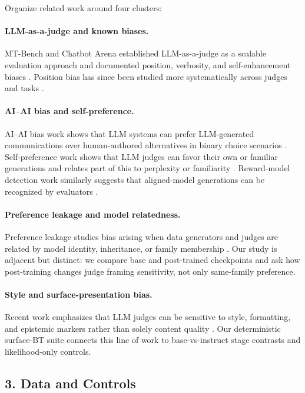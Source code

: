 \documentclass[11pt]{article}
\begin{document}
Organize related work around four clusters:

\paragraph{LLM-as-a-judge and known biases.}
MT-Bench and Chatbot Arena established LLM-as-a-judge as a scalable evaluation
approach and documented position, verbosity, and self-enhancement biases
\citep{zheng2023mtbench}. Position bias has since been studied more
systematically across judges and tasks \citep{shi2024positionbias}.

\paragraph{AI--AI bias and self-preference.}
AI--AI bias work shows that LLM systems can prefer LLM-generated
communications over human-authored alternatives in binary choice scenarios
\citep{laurito2025aiaibias}. Self-preference work shows that LLM judges can
favor their own or familiar generations and relates part of this to perplexity
or familiarity \citep{panickssery2024selfrecognition,
wataoka2024selfpreference}. Reward-model detection work similarly suggests
that aligned-model generations can be recognized by evaluators
\citep{lee2024remodetect}.

\paragraph{Preference leakage and model relatedness.}
Preference leakage studies bias arising when data generators and judges are
related by model identity, inheritance, or family membership
\citep{li2025preferenceleakage}. Our study is adjacent but distinct: we compare
base and post-trained checkpoints and ask how post-training changes judge
framing sensitivity, not only same-family preference.

\paragraph{Style and surface-presentation bias.}
Recent work emphasizes that LLM judges can be sensitive to style, formatting,
and epistemic markers rather than solely content quality
\citep{lee2024ember,soumik2026judging}. Our deterministic surface-BT suite
connects this line of work to base-vs-instruct stage contrasts and
likelihood-only controls.

\subsection{3. Data and Controls}
\end{document}
